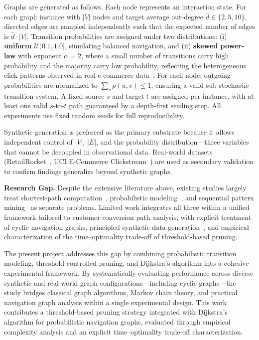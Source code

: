 Graphs are generated as follows. Each node represents an interaction state. For each graph instance with $|V|$ nodes and target average out-degree $\bar{d} \in \{2, 5, 10\}$, directed edges are sampled independently such that the expected number of edges is $\bar{d} \cdot |V|$. Transition probabilities are assigned under two distributions: (i) \textbf{uniform} $\mathcal{U}(0.1, 1.0]$, simulating balanced navigation, and (ii) \textbf{skewed power-law} with exponent $\alpha = 2$, where a small number of transitions carry high probability and the majority carry low probability, reflecting the heterogeneous click patterns observed in real e-commerce data~\citep{bucklin2003clickstream,retailrocket2015}. For each node, outgoing probabilities are normalized to $\sum_v p(u,v) \leq 1$, ensuring a valid sub-stochastic transition system. A fixed source $s$ and target $t$ are assigned per instance, with at least one valid $s$-to-$t$ path guaranteed by a depth-first seeding step. All experiments use fixed random seeds for full reproducibility.

Synthetic generation is preferred as the primary substrate because it allows independent control of $|V|$, $|E|$, and the probability distribution---three variables that cannot be decoupled in observational data. Real-world datasets (RetailRocket~\citep{retailrocket2015}, UCI E-Commerce Clickstream~\citep{uci2008eshop}) are used as secondary validation to confirm findings generalize beyond synthetic graphs.

\vspace{0.5cm}
\noindent\textbf{Research Gap.} Despite the extensive literature above, existing studies largely treat shortest-path computation~\citep{dijkstra1959,cormen2009}, probabilistic modeling~\citep{norris1998markov}, and sequential pattern mining~\citep{pei2001prefixspan} as separate problems. Limited work integrates all three within a unified framework tailored to customer conversion path analysis, with explicit treatment of cyclic navigation graphs, principled synthetic data generation~\citep{erdosrenyi1960}, and empirical characterization of the time--optimality trade-off of threshold-based pruning.

The present project addresses this gap by combining probabilistic transition modeling, threshold-controlled pruning, and Dijkstra's algorithm into a cohesive experimental framework. By systematically evaluating performance across diverse synthetic and real-world graph configurations---including cyclic graphs---the study bridges classical graph algorithms, Markov chain theory, and practical navigation graph analysis within a single experimental design. This work contributes a threshold-based pruning strategy integrated with Dijkstra's algorithm for probabilistic navigation graphs, evaluated through empirical complexity analysis and an explicit time--optimality trade-off characterization.

